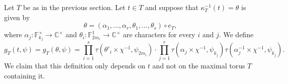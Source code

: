 \documentclass[12pt, reqno]{amsart}
\theoremstyle{definition}
\theoremstyle{definition}
\theoremstyle{definition}
\newcommand{\cComplex}{\mathbb{C}}
\newcommand{\multiplicativegroup}[1]{#1^{\times}}
\newcommand{\fieldCharacter}{\psi}
\newcommand{\finiteField}{\mathbb{F}}
\newcommand{\finiteFieldExtension}[1]{\finiteField_{#1}}
\newcommand{\GaussSumCharacter}[3]{\tau\left(#1 \times #2, #3\right)}
\newcommand{\ToriDualToriIsomorphism}{\kappa}
\begin{document}
Let $T$ be as in the previous section. Let $t \in T$ and suppose that $\ToriDualToriIsomorphism_{T}^{-1}\left(t\right) = \theta$ is given by $$\theta = \left(\alpha_1,\dots,\alpha_r,\theta_1,\dots,\theta_s\right) \circ e_T,$$ where $\alpha_j \colon \multiplicativegroup{\finiteFieldExtension{k_j}} \to \multiplicativegroup{\cComplex}$ and $\theta_i \colon \finiteFieldExtension{2m_i}^1 \to \multiplicativegroup{\cComplex}$ are characters for every $i$ and $j$.
We define $$g_T\left(t, \fieldCharacter\right) = g_T\left(\theta, \fieldCharacter\right) = \prod_{i=1}^s \GaussSumCharacter{\theta'_i}{\chi^{-1}}{\fieldCharacter_{2m_i}} \cdot  \prod_{j=1}^r \GaussSumCharacter{\alpha_j}{\chi^{-1}}{\fieldCharacter_{k_j}} \GaussSumCharacter{\alpha_j^{-1}}{\chi^{-1}}{\fieldCharacter_{k_j}}.$$
We claim that this definition only depends on $t$ and not on the maximal torus $T$ containing it.
\end{document}
